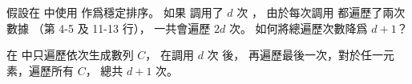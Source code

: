 \startEXERCISE
假設在  中使用  作爲穩定排序。
如果  調用了 $d$ 次 ，
由於每次調用  都遍歷了兩次數據
（第 4-5 及 11-13 行），
一共會遍歷 $2d$ 次。
如何將總遍歷次數降爲 $d+1$？
\stopEXERCISE

\startANSWER
在  中只遍歷依次生成數列 $C$，
在調用 $d$ 次  後，
再遍歷最後一次，對於任一元素，遍歷所有 $C$，
總共 $d+1$ 次。
\stopANSWER
